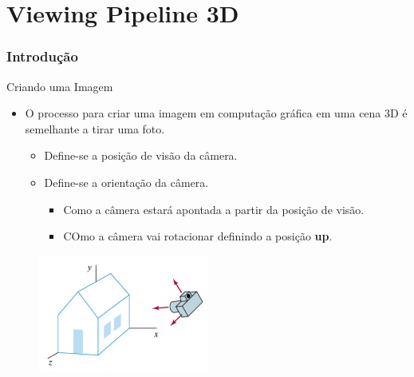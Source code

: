 \documentclass{beamer}
\begin{document}
\section{Viewing Pipeline 3D}
\begin{frame}
\frametitle{Introdução}


	\begin{block}{Criando uma Imagem}
		\begin{itemize}
			\item O processo para criar uma imagem em computação gráfica em uma cena 3D é semelhante a tirar uma foto.
			\begin{itemize}
				\item Define-se a posição de visão da câmera.
				\item Define-se a orientação da câmera.
				\begin{itemize}
					\item Como a câmera estará apontada a partir da posição de visão.
					\item COmo a câmera vai rotacionar definindo a posição \textbf{up}.
				\end{itemize}
			\end{itemize}
		\end{itemize}
	\end{block}
	
	\begin{figure}[!h]
			\begin{center}
			\includegraphics[width=0.5\textwidth]{Figures/CamPos}
			\end{center}
	\end{figure}	
\end{frame}
\end{document}
